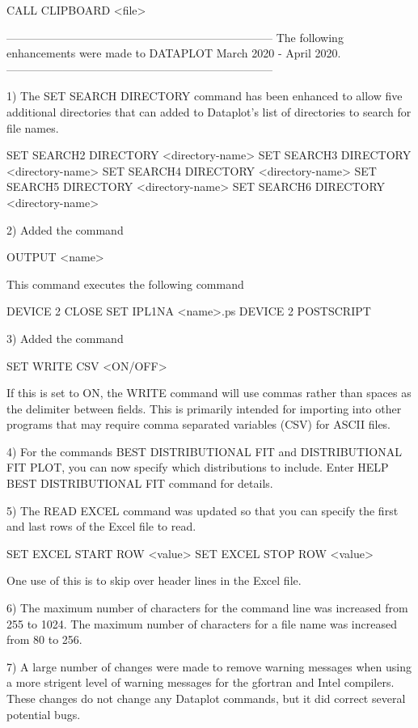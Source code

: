          CALL CLIPBOARD  <file>

-----------------------------------------------------------------------
The following enhancements were made to DATAPLOT
March 2020 - April 2020.
-----------------------------------------------------------------------

 1) The SET SEARCH DIRECTORY command has been enhanced to allow five
    additional directories that can added to Dataplot's list of directories
    to search for file names.

       SET SEARCH2 DIRECTORY <directory-name>
       SET SEARCH3 DIRECTORY <directory-name>
       SET SEARCH4 DIRECTORY <directory-name>
       SET SEARCH5 DIRECTORY <directory-name>
       SET SEARCH6 DIRECTORY <directory-name>

 2) Added the command

       OUTPUT  <name>

    This command executes the following command

       DEVICE 2 CLOSE
       SET IPL1NA <name>.ps
       DEVICE 2 POSTSCRIPT

 3) Added the command

       SET WRITE CSV  <ON/OFF>

    If this is set to ON, the WRITE command will use commas rather
    than spaces as the delimiter between fields.  This is primarily
    intended for importing into other programs that may require
    comma separated variables (CSV) for ASCII files.

 4) For the commands BEST DISTRIBUTIONAL FIT and DISTRIBUTIONAL FIT PLOT,
    you can now specify which distributions to include.  Enter
    HELP BEST DISTRIBUTIONAL FIT command for details.

 5) The READ EXCEL command was updated so that you can specify the
    first and last rows of the Excel file to read.

        SET EXCEL START ROW <value>
        SET EXCEL STOP  ROW <value>

    One use of this is to skip over header lines in the Excel file.

 6) The maximum number of characters for the command line was
    increased from 255 to 1024.  The maximum number of characters
    for a file name was increased from 80 to 256.

 7) A large number of changes were made to remove warning messages
    when using a more strigent level of warning messages for the
    gfortran and Intel compilers.  These changes do not change
    any Dataplot commands, but it did correct several potential
    bugs.

